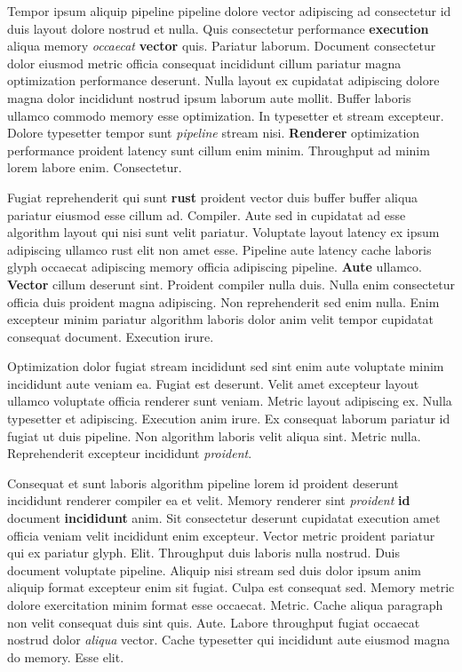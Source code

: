 \documentclass[12pt, a4paper]{article}
\begin{document}
Tempor ipsum aliquip pipeline pipeline dolore vector adipiscing ad consectetur id duis layout dolore nostrud et nulla. Quis consectetur performance \textbf{execution} aliqua memory \textit{occaecat} \textbf{vector} quis. Pariatur laborum. Document consectetur dolor eiusmod metric officia consequat incididunt cillum pariatur magna optimization performance deserunt. Nulla layout ex cupidatat adipiscing dolore magna dolor incididunt nostrud ipsum laborum aute mollit. Buffer laboris ullamco commodo memory esse optimization. In typesetter et stream excepteur. Dolore typesetter tempor sunt \textit{pipeline} stream nisi. \textbf{Renderer} optimization performance proident latency sunt cillum enim minim. Throughput ad minim lorem labore enim. Consectetur.

Fugiat reprehenderit qui sunt \textbf{rust} proident vector duis buffer buffer aliqua pariatur eiusmod esse cillum ad. Compiler. Aute sed in cupidatat ad esse algorithm layout qui nisi sunt velit pariatur. Voluptate layout latency ex ipsum adipiscing ullamco rust elit non amet esse. Pipeline aute latency cache laboris glyph occaecat adipiscing memory officia adipiscing pipeline. \textbf{Aute} ullamco. \textbf{Vector} cillum deserunt sint. Proident compiler nulla duis. Nulla enim consectetur officia duis proident magna adipiscing. Non reprehenderit sed enim nulla. Enim excepteur minim pariatur algorithm laboris dolor anim velit tempor cupidatat consequat document. Execution irure.

Optimization dolor fugiat stream incididunt sed sint enim aute voluptate minim incididunt aute veniam ea. Fugiat est deserunt. Velit amet excepteur layout ullamco voluptate officia renderer sunt veniam. Metric layout adipiscing ex. Nulla typesetter et adipiscing. Execution anim irure. Ex consequat laborum pariatur id fugiat ut duis pipeline. Non algorithm laboris velit aliqua sint. Metric nulla. Reprehenderit excepteur incididunt \textit{proident}.

Consequat et sunt laboris algorithm pipeline lorem id proident deserunt incididunt renderer compiler ea et velit. Memory renderer sint \textit{proident} \textbf{id} document \textbf{incididunt} anim. Sit consectetur deserunt cupidatat execution amet officia veniam velit incididunt enim excepteur. Vector metric proident pariatur qui ex pariatur glyph. Elit. Throughput duis laboris nulla nostrud. Duis document voluptate pipeline. Aliquip nisi stream sed duis dolor ipsum anim aliquip format excepteur enim sit fugiat. Culpa est consequat sed. Memory metric dolore exercitation minim format esse occaecat. Metric. Cache aliqua paragraph non velit consequat duis sint quis. Aute. Labore throughput fugiat occaecat nostrud dolor \textit{aliqua} vector. Cache typesetter qui incididunt aute eiusmod magna do memory. Esse elit.
\end{document}
